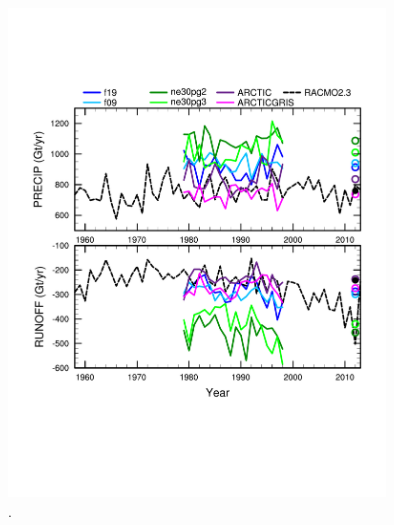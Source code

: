 \documentclass[draft]{agujournal2019}
\begin{document}
\begin{figure}[t]
\begin{center}
         \includegraphics[width=100mm]{figs/temp_tseries_GRIS_map_TO_f19.pdf}
\end{center}
\caption{.}
\label{fig:tseries}
\end{figure}
\end{document}
